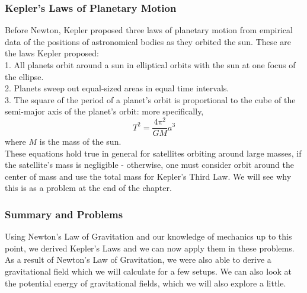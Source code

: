 \subsubsection{Kepler's Laws of Planetary Motion}
Before Newton, Kepler proposed three laws of planetary motion from empirical data of the positions of astronomical bodies as they orbited the sun. These are the laws Kepler proposed: \\
1. All planets orbit around a sun in elliptical orbits with the sun at one focus of the ellipse.\\
2. Planets sweep out equal-sized areas in equal time intervals. \\
3. The square of the period of a planet's orbit is proportional to the cube of the semi-major axis of the planet's orbit: more specifically, 
\[
	T^2 = \frac{4\pi^2}{GM} a^3
\]
where $M$ is the mass of the sun. \\

These equations hold true in general for satellites orbiting around large masses, if the satellite's mass is negligible - otherwise, one must consider orbit around the center of mass and use the total mass for Kepler's Third Law. We will see why this is as a problem at the end of the chapter.
\subsubsection{Summary and Problems} 
Using Newton's Law of Gravitation and our knowledge of mechanics up to this point, we derived Kepler's Laws and we can now apply them in these problems. As a result of Newton's Law of Gravitation, we were also able to derive a gravitational field which we will calculate for a few setups. We can also look at the potential energy of gravitational fields, which we will also explore a little. \\

